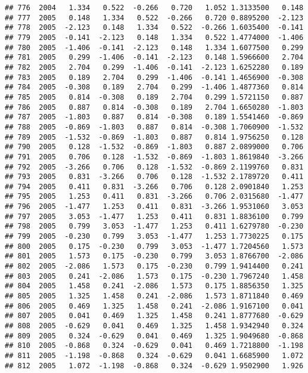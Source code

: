 \documentclass[]{article}
\begin{document}
\begin{verbatim}
## 776  2004   1.334   0.522  -0.266   0.720   1.052 1.3133500   0.148
## 777  2005   0.148   1.334   0.522  -0.266   0.720 0.8895200  -2.123
## 778  2005  -2.123   0.148   1.334   0.522  -0.266 1.6035400  -0.141
## 779  2005  -0.141  -2.123   0.148   1.334   0.522 1.4774000  -1.406
## 780  2005  -1.406  -0.141  -2.123   0.148   1.334 1.6077500   0.299
## 781  2005   0.299  -1.406  -0.141  -2.123   0.148 1.5966600   2.704
## 782  2005   2.704   0.299  -1.406  -0.141  -2.123 1.6252280   0.189
## 783  2005   0.189   2.704   0.299  -1.406  -0.141 1.4656900  -0.308
## 784  2005  -0.308   0.189   2.704   0.299  -1.406 1.4877360   0.814
## 785  2005   0.814  -0.308   0.189   2.704   0.299 1.5721150   0.887
## 786  2005   0.887   0.814  -0.308   0.189   2.704 1.6650280  -1.803
## 787  2005  -1.803   0.887   0.814  -0.308   0.189 1.5541460  -0.869
## 788  2005  -0.869  -1.803   0.887   0.814  -0.308 1.7060900  -1.532
## 789  2005  -1.532  -0.869  -1.803   0.887   0.814 1.9756250   0.128
## 790  2005   0.128  -1.532  -0.869  -1.803   0.887 2.0899000   0.706
## 791  2005   0.706   0.128  -1.532  -0.869  -1.803 1.8619840  -3.266
## 792  2005  -3.266   0.706   0.128  -1.532  -0.869 2.1199760   0.831
## 793  2005   0.831  -3.266   0.706   0.128  -1.532 2.1789720   0.411
## 794  2005   0.411   0.831  -3.266   0.706   0.128 2.0901840   1.253
## 795  2005   1.253   0.411   0.831  -3.266   0.706 2.0315680  -1.477
## 796  2005  -1.477   1.253   0.411   0.831  -3.266 1.9531060   3.053
## 797  2005   3.053  -1.477   1.253   0.411   0.831 1.8836100   0.799
## 798  2005   0.799   3.053  -1.477   1.253   0.411 1.6279780  -0.230
## 799  2005  -0.230   0.799   3.053  -1.477   1.253 1.7730225   0.175
## 800  2005   0.175  -0.230   0.799   3.053  -1.477 1.7204560   1.573
## 801  2005   1.573   0.175  -0.230   0.799   3.053 1.8766700  -2.086
## 802  2005  -2.086   1.573   0.175  -0.230   0.799 1.9414400   0.241
## 803  2005   0.241  -2.086   1.573   0.175  -0.230 1.7967240   1.458
## 804  2005   1.458   0.241  -2.086   1.573   0.175 1.8856350   1.325
## 805  2005   1.325   1.458   0.241  -2.086   1.573 1.8711840   0.469
## 806  2005   0.469   1.325   1.458   0.241  -2.086 1.9167100   0.041
## 807  2005   0.041   0.469   1.325   1.458   0.241 1.8777680  -0.629
## 808  2005  -0.629   0.041   0.469   1.325   1.458 1.9342940   0.324
## 809  2005   0.324  -0.629   0.041   0.469   1.325 1.9049680  -0.868
## 810  2005  -0.868   0.324  -0.629   0.041   0.469 1.7218800  -1.198
## 811  2005  -1.198  -0.868   0.324  -0.629   0.041 1.6685900   1.072
## 812  2005   1.072  -1.198  -0.868   0.324  -0.629 1.9502900   1.926

\end{verbatim}
\end{document}

